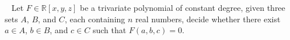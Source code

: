 \begin{problem}[3POL]~\label{problem:3pol}
Let $F \in \mathbb{R}[x,y,z]$ be a trivariate polynomial of constant degree,
given three sets $A$, $B$, and $C$, each containing $n$ real numbers, decide
whether there exist $a \in A$, $b \in B$, and $c \in C$ such that
$F(a,b,c)=0$.
\end{problem}
